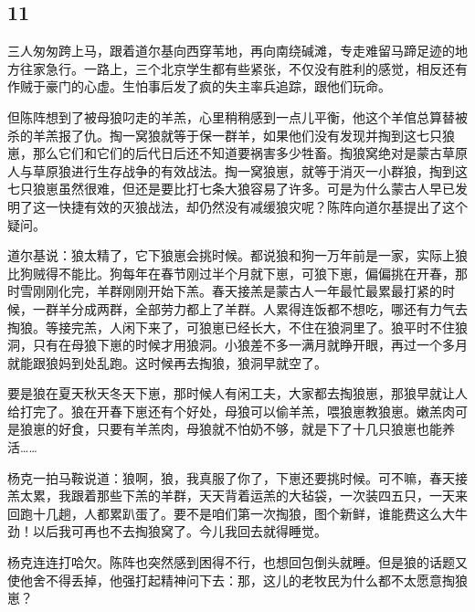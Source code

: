 \subsection*{11}


\par 三人匆匆跨上马，跟着道尔基向西穿苇地，再向南绕碱滩，专走难留马蹄足迹的地方往家急行。一路上，三个北京学生都有些紧张，不仅没有胜利的感觉，相反还有作贼于豪门的心虚。生怕事后发了疯的失主率兵追踪，跟他们玩命。
\par 但陈阵想到了被母狼叼走的羊羔，心里稍稍感到一点儿平衡，他这个羊倌总算替被杀的羊羔报了仇。掏一窝狼就等于保一群羊，如果他们没有发现并掏到这七只狼崽，那么它们和它们的后代日后还不知道要祸害多少牲畜。掏狼窝绝对是蒙古草原人与草原狼进行生存战争的有效战法。掏一窝狼崽，就等于消灭一小群狼，掏到这七只狼崽虽然很难，但还是要比打七条大狼容易了许多。可是为什么蒙古人早已发明了这一快捷有效的灭狼战法，却仍然没有减缓狼灾呢？陈阵向道尔基提出了这个疑问。
\par 道尔基说：狼太精了，它下狼崽会挑时候。都说狼和狗一万年前是一家，实际上狼比狗贼得不能比。狗每年在春节刚过半个月就下崽，可狼下崽，偏偏挑在开春，那时雪刚刚化完，羊群刚刚开始下羔。春天接羔是蒙古人一年最忙最累最打紧的时候，一群羊分成两群，全部劳力都上了羊群。人累得连饭都不想吃，哪还有力气去掏狼。等接完羔，人闲下来了，可狼崽已经长大，不住在狼洞里了。狼平时不住狼洞，只有在母狼下崽的时候才用狼洞。小狼差不多一满月就睁开眼，再过一个多月就能跟狼妈到处乱跑。这时候再去掏狼，狼洞早就空了。
\par 要是狼在夏天秋天冬天下崽，那时候人有闲工夫，大家都去掏狼崽，那狼早就让人给打完了。狼在开春下崽还有个好处，母狼可以偷羊羔，喂狼崽教狼崽。嫩羔肉可是狼崽的好食，只要有羊羔肉，母狼就不怕奶不够，就是下了十几只狼崽也能养活……
\par 杨克一拍马鞍说道：狼啊，狼，我真服了你了，下崽还要挑时候。可不嘛，春天接羔太累，我跟着那些下羔的羊群，天天背着运羔的大毡袋，一次装四五只，一天来回跑十几趟，人都累趴蛋了。要不是咱们第一次掏狼，图个新鲜，谁能费这么大牛劲！以后我可再也不去掏狼窝了。今儿我回去就得睡觉。
\par 杨克连连打哈欠。陈阵也突然感到困得不行，也想回包倒头就睡。但是狼的话题又使他舍不得丢掉，他强打起精神问下去：那，这儿的老牧民为什么都不太愿意掏狼崽？
